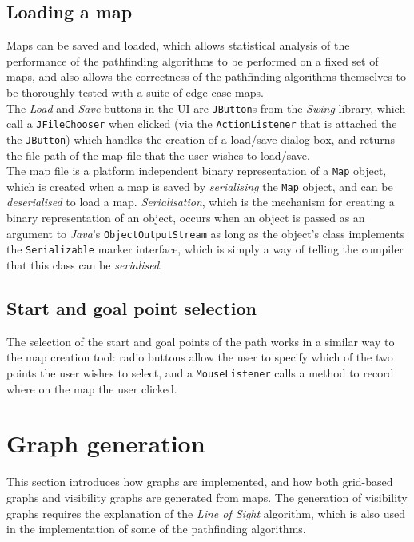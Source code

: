 \documentclass[12pt,notitlepage]{report}
\begin{document}
\subsection{Loading a map}
Maps can be saved and loaded, which allows statistical analysis of the performance of the pathfinding algorithms to be performed on a fixed set of maps, and also allows the correctness of the pathfinding algorithms themselves to be thoroughly tested with a suite of edge case maps.\\

\noindent
The {\em Load} and {\em Save} buttons in the UI are {\tt JButton}s from the {\em Swing} library, which call a {\tt JFileChooser} when clicked (via the {\tt ActionListener} that is attached the the {\tt JButton}) which handles the creation of a load/save dialog box, and returns the file path of the map file that the user wishes to load/save.\\

\noindent
The map file is a platform independent binary representation of a {\tt Map} object, which is created when a map is saved by {\em serialising} the {\tt Map} object, and can be {\em deserialised} to load a map. {\em Serialisation}, which is the mechanism for creating a binary representation of an object, occurs when an object is passed as an argument to {\em Java}'s {\tt ObjectOutputStream} as long as the object's class implements the {\tt Serializable} marker interface, which is simply a way of telling the compiler that this class can be {\em serialised}.

\subsection{Start and goal point selection}
The selection of the start and goal points of the path works in a similar way to the map creation tool: radio buttons allow the user to specify which of the two points the user wishes to select, and a {\tt MouseListener} calls a method to record where on the map the user clicked.

\section{Graph generation}

This section introduces how graphs are implemented, and how both grid-based graphs and visibility graphs are generated from maps. The generation of visibility graphs requires the explanation of the {\em Line of Sight} algorithm, which is also used in the implementation of some of the pathfinding algorithms.\\
\end{document}
